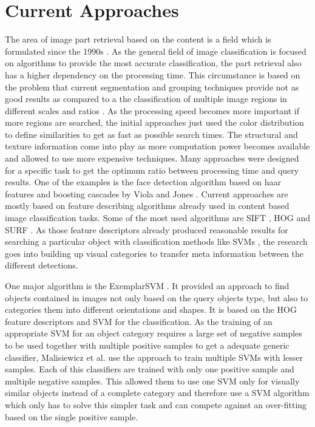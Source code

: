 \chapter{Current Approaches}

The area of image part retrieval based on the content is a field which is formulated since the 1990s \cite{eakins1999content} \cite{rui1997content} \cite{osuna1997training}. As the general field of image classification is focused on algorithms to provide the most accurate classification, the part retrieval also has a higher dependency on the processing time. This circumstance is based on the problem that current segmentation and grouping techniques provide not as good results as compared to a the classification of multiple image regions in different scales and ratios \cite{book:848523}. As the processing speed becomes more important if more regions are searched, the initial approaches just used the color distribution to define similarities to get as fast as possible search times. The structural and texture information come into play as more computation power becomes available and allowed to use more expensive techniques. Many approaches were designed for a specific task to get the optimum ratio between processing time and query results. One of the examples is the face detection algorithm based on haar features and boosting cascades by Viola and Jones \cite{viola2001rapid}. Current approaches are mostly based on feature describing algorithms already used in content based image classification tasks. Some of the most used algorithms are \acf{SIFT} \cite{Lowe2004}, \acf{HOG} \cite{Dalal2005} and \acf{SURF} \cite{bay2008speeded}. As those feature descriptors already produced reasonable results for searching a particular object with classification methods like \aclp{SVM} \cite{cortes1995support}, the research goes into building up visual categories to transfer meta information between the different detections.

One major algorithm is the ExemplarSVM \cite{Malisiewicz2011}. It provided an approach to find objects contained in images not only based on the query objects type, but also to categories them into different orientations and shapes.
It is based on the \ac{HOG} feature descriptors and \ac{SVM} for the classification. As the training of an appropriate \ac{SVM} for an object category requires a large set of negative samples to be used together with multiple positive samples to get a adequate generic classifier, Malisiewicz et al. use the approach to train multiple \acp{SVM} with lesser samples. Each of this classifiers are trained with only one positive sample and multiple negative samples. This allowed them to use one \ac{SVM} only for visually similar objects instead of a complete category and therefore use a \ac{SVM} algorithm which only has to solve this simpler task and can compete against an over-fitting based on the single positive sample.

